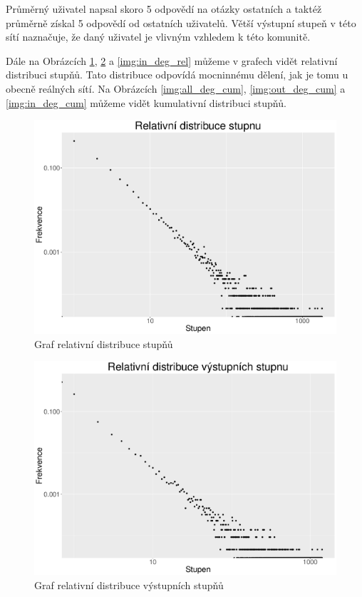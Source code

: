 \documentclass[a4paper,12pt]{article}
\begin{document}
Průměrný uživatel napsal skoro 5 odpovědí na otázky ostatních a taktéž průměrně získal 5 odpovědí 
od ostatních uživatelů. Větší výstupní stupeň v této sítí naznačuje, že daný uživatel je vlivným 
vzhledem k této komunitě.

Dále na Obrázcích \ref{img:all_deg_rel}, \ref{img:out_deg_rel} a \ref{img:in_deg_rel} můžeme 
v grafech vidět relativní distribuci stupňů. Tato distribuce odpovídá mocninnému dělení, 
jak je tomu u obecně reálných sítí. Na Obrázcích \ref{img:all_deg_cum}, \ref{img:out_deg_cum} a
\ref{img:in_deg_cum} můžeme vidět kumulativní distribuci stupňů.

\begin{figure}[h!]
\centering
\includegraphics[scale=0.4]{images/all_deg_rel.pdf}
\caption{Graf relativní distribuce stupňů}
\label{img:all_deg_rel}
\end{figure}

\begin{figure}[h!]
\centering
\includegraphics[scale=0.4]{images/out_deg_rel.pdf}
\caption{Graf relativní distribuce výstupních stupňů}
\label{img:out_deg_rel}
\end{figure}
\end{document}
